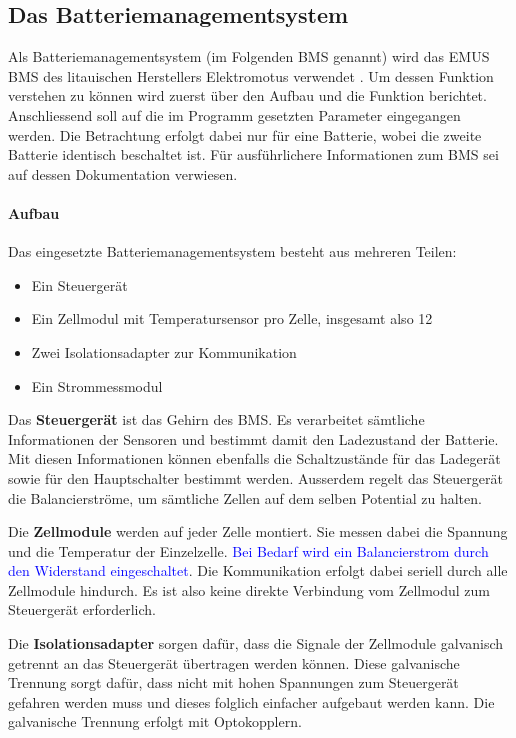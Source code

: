 \subsection{Das Batteriemanagementsystem}

Als Batteriemanagementsystem (im Folgenden BMS genannt) wird das EMUS BMS des litauischen Herstellers Elektromotus verwendet \cite{emus}. Um dessen Funktion verstehen zu können wird zuerst über den Aufbau und die Funktion berichtet. Anschliessend soll auf die im Programm gesetzten Parameter eingegangen werden. Die Betrachtung erfolgt dabei nur für eine Batterie, wobei die zweite Batterie identisch beschaltet ist. Für ausführlichere Informationen zum BMS sei auf dessen Dokumentation \cite{bms} verwiesen.

\paragraph{Aufbau}
Das eingesetzte Batteriemanagementsystem besteht aus mehreren Teilen: \begin{itemize}
	\item Ein Steuergerät
	\item Ein Zellmodul mit Temperatursensor pro Zelle, insgesamt also 12
	\item Zwei Isolationsadapter zur Kommunikation
	\item Ein Strommessmodul
\end{itemize}

Das \textbf{Steuergerät} ist das Gehirn des BMS. Es verarbeitet sämtliche Informationen der Sensoren und bestimmt damit den Ladezustand der Batterie. Mit diesen Informationen können ebenfalls die Schaltzustände für das Ladegerät sowie für den Hauptschalter bestimmt werden. Ausserdem regelt das Steuergerät die Balancierströme, um sämtliche Zellen auf dem selben Potential zu halten.

Die \textbf{Zellmodule} werden auf jeder Zelle montiert. Sie messen dabei die Spannung und die Temperatur der Einzelzelle. \textcolor{blue}{Bei Bedarf wird ein Balancierstrom durch den Widerstand eingeschaltet}. Die Kommunikation erfolgt dabei seriell durch alle Zellmodule hindurch. Es ist also keine direkte Verbindung vom Zellmodul zum Steuergerät erforderlich.

Die \textbf{Isolationsadapter} sorgen dafür, dass die Signale der Zellmodule galvanisch getrennt an das Steuergerät übertragen werden können. Diese galvanische Trennung sorgt dafür, dass nicht mit hohen Spannungen zum Steuergerät gefahren werden muss und dieses folglich einfacher aufgebaut werden kann. Die galvanische Trennung erfolgt mit Optokopplern.

